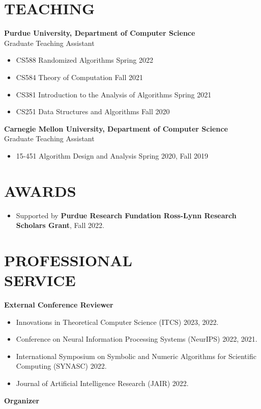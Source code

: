 \documentclass[margin, 10pt]{res} %
\begin{document}
\begin{resume}
\section{TEACHING}

{\bf Purdue University, Department of Computer Science}\\
Graduate Teaching Assistant

\begin{itemize}
\item CS588 Randomized Algorithms \hfill Spring 2022
\item CS584 Theory of Computation \hfill Fall 2021
\item CS381 Introduction to the Analysis of Algorithms \hfill Spring 2021
\item CS251 Data Structures and Algorithms \hfill Fall 2020
\end{itemize}
{\bf Carnegie Mellon University, Department of Computer Science}\\
Graduate Teaching Assistant

\begin{itemize}
\item 15-451 Algorithm Design and Analysis \hfill Spring 2020, Fall 2019
\end{itemize}

\section{AWARDS}
\begin{itemize}
\item Supported by {\bf Purdue Research Fundation Ross-Lynn Research Scholars Grant}, Fall 2022.
\end{itemize}

\section{PROFESSIONAL \\ SERVICE}

{\bf External Conference Reviewer}

\begin{itemize}
\item Innovations in Theoretical Computer Science (ITCS) 2023, 2022.
\item Conference on Neural Information Processing Systems (NeurIPS) 2022, 2021.
\item International Symposium on Symbolic and Numeric Algorithms for Scientific Computing (SYNASC) 2022.
\item Journal of Artificial Intelligence Research (JAIR) 2022.
\end{itemize}
{\bf Organizer}


\end{resume}
\end{document}
